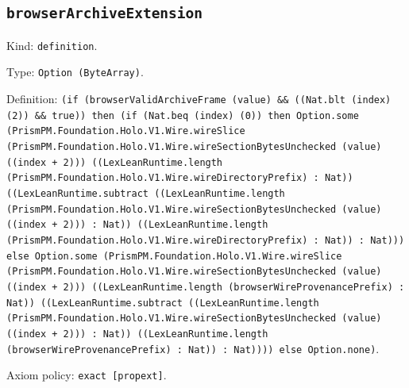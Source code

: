 \documentclass[11pt]{article}
\begin{document}
\subsection*{\texttt{browserArchiveExtension}}
\noindent Kind: \texttt{definition}.\par
\noindent Type: \texttt{Option (ByteArray)}.\par
\noindent Definition: \texttt{(if (browserValidArchiveFrame (value) \&\& ((Nat.blt (index) (2)) \&\& true)) then (if (Nat.beq (index) (0)) then Option.some (PrismPM.Foundation.Holo.V1.Wire.wireSlice (PrismPM.Foundation.Holo.V1.Wire.wireSectionBytesUnchecked (value) ((index + 2))) ((LexLeanRuntime.length (PrismPM.Foundation.Holo.V1.Wire.wireDirectoryPrefix) : Nat)) ((LexLeanRuntime.subtract ((LexLeanRuntime.length (PrismPM.Foundation.Holo.V1.Wire.wireSectionBytesUnchecked (value) ((index + 2))) : Nat)) ((LexLeanRuntime.length (PrismPM.Foundation.Holo.V1.Wire.wireDirectoryPrefix) : Nat)) : Nat))) else Option.some (PrismPM.Foundation.Holo.V1.Wire.wireSlice (PrismPM.Foundation.Holo.V1.Wire.wireSectionBytesUnchecked (value) ((index + 2))) ((LexLeanRuntime.length (browserWireProvenancePrefix) : Nat)) ((LexLeanRuntime.subtract ((LexLeanRuntime.length (PrismPM.Foundation.Holo.V1.Wire.wireSectionBytesUnchecked (value) ((index + 2))) : Nat)) ((LexLeanRuntime.length (browserWireProvenancePrefix) : Nat)) : Nat)))) else Option.none)}.\par
\noindent Axiom policy: \texttt{exact [propext]}.\par
\end{document}
